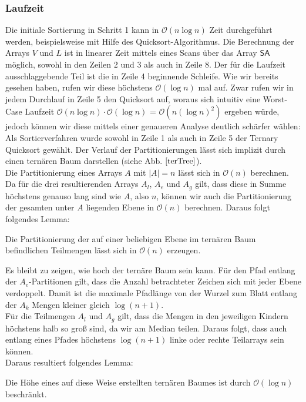 \subsubsection{Laufzeit}
Die initiale Sortierung in Schritt 1 kann in $\mathcal{O}(n\log n)$ Zeit durchgeführt werden, beispielsweise mit Hilfe des Quicksort-Algorithmus. Die Berechnung der Arrays $V$ und $L$ ist in linearer Zeit mittels eines Scans über das Array $\mathsf{SA}$ möglich, sowohl in den Zeilen 2 und 3 als auch in Zeile 8. Der für die Laufzeit ausschlaggebende Teil ist die in Zeile 4 beginnende Schleife. Wie wir bereits gesehen haben, rufen wir diese höchstens $\mathcal{O}(\log n)$ mal auf. Zwar rufen wir in jedem Durchlauf in Zeile 5 den Quicksort auf, woraus sich intuitiv eine Worst-Case Laufzeit $\mathcal{O}(n\log  n)\cdot \mathcal{O}(\log n)$ = $\mathcal{O}(n(\log n)^2)$ ergeben würde, jedoch können wir diese mittels einer genaueren Analyse deutlich schärfer wählen:\\
Als Sortierverfahren wurde sowohl in Zeile 1 als auch in Zeile 5 der Ternary Quicksort gewählt. Der Verlauf der Partitionierungen lässt sich implizit durch einen ternären Baum darstellen (siehe Abb. $\ref{terTree}$).\\
Die Partitionierung eines Arrays $A$ mit $|A|=n$ lässt sich in $\mathcal{O}(n)$ berechnen. Da für die drei resultierenden Arrays $A_l$, $A_e$ und $A_g$ gilt, dass diese in Summe höchstens genauso lang sind wie $A$, also $n$, können wir auch die Partitionierung der gesamten unter $A$ liegenden Ebene in $\mathcal{O}(n)$ berechnen. Daraus folgt folgendes Lemma:
\begin{lemma}
Die Partitionierung der auf einer beliebigen Ebene im ternären Baum befindlichen Teilmengen lässt sich in $\mathcal{O}(n)$ erzeugen. 
\end{lemma}
Es bleibt zu zeigen, wie hoch der ternäre Baum sein kann. Für den Pfad entlang der $A_e$-Partitionen gilt, dass die Anzahl betrachteter Zeichen sich mit jeder Ebene verdoppelt. Damit ist die maximale Pfadlänge von der Wurzel zum Blatt entlang der $A_k$ Mengen kleiner gleich $ \log (n+1)$.\\
Für die Teilmengen $A_l$ und $A_g$ gilt, dass die Mengen in den jeweiligen Kindern höchstens halb so groß sind, da wir am Median teilen. Daraus folgt, dass auch entlang eines Pfades höchstens $\log (n+1)$ linke oder rechte Teilarrays sein können.\\
Daraus resultiert folgendes Lemma:
\begin{lemma}
Die Höhe eines auf diese Weise erstellten ternären Baumes ist durch $\mathcal{O}(\log n)$ beschränkt.
\end{lemma}
